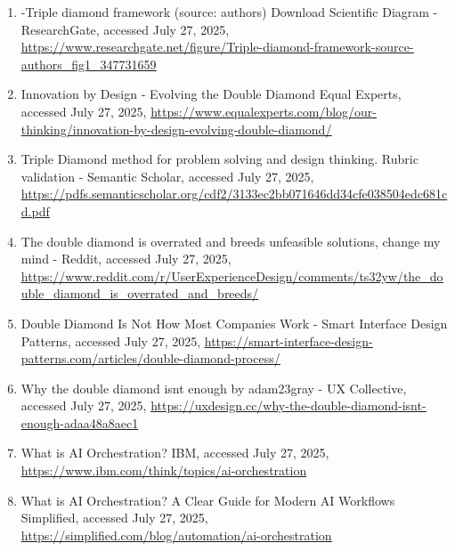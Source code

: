 \documentclass[
  12pt,
  a4paper,
  bibliography=totoc,
  numbers=noenddot
]{scrartcl}
\begin{document}
\begin{enumerate}
\item
  -Triple diamond framework (source: authors) \textbar{} Download
  Scientific Diagram - ResearchGate, accessed July 27, 2025,
  \href{https://www.researchgate.net/figure/Triple-diamond-framework-source-authors_fig1_347731659}{\ul{https://www.researchgate.net/figure/Triple-diamond-framework-source-authors\_fig1\_347731659}}
\item
  Innovation by Design - Evolving the Double Diamond \textbar{} Equal
  Experts, accessed July 27, 2025,
  \href{https://www.equalexperts.com/blog/our-thinking/innovation-by-design-evolving-double-diamond/}{\ul{https://www.equalexperts.com/blog/our-thinking/innovation-by-design-evolving-double-diamond/}}
\item
  Triple Diamond method for problem solving and design thinking. Rubric
  validation - Semantic Scholar, accessed July 27, 2025,
  \href{https://pdfs.semanticscholar.org/cdf2/3133ec2bb071646dd34cfe038504edc681cd.pdf}{\ul{https://pdfs.semanticscholar.org/cdf2/3133ec2bb071646dd34cfe038504edc681cd.pdf}}
\item
  The double diamond is overrated and breeds unfeasible solutions,
  change my mind - Reddit, accessed July 27, 2025,
  \href{https://www.reddit.com/r/UserExperienceDesign/comments/ts32yw/the_double_diamond_is_overrated_and_breeds/}{\ul{https://www.reddit.com/r/UserExperienceDesign/comments/ts32yw/the\_double\_diamond\_is\_overrated\_and\_breeds/}}
\item
  Double Diamond Is Not How Most Companies Work - Smart Interface Design
  Patterns, accessed July 27, 2025,
  \href{https://smart-interface-design-patterns.com/articles/double-diamond-process/}{\ul{https://smart-interface-design-patterns.com/articles/double-diamond-process/}}
\item
  Why the double diamond isn\textquotesingle t enough \textbar{} by
  adam23gray - UX Collective, accessed July 27, 2025,
  \href{https://uxdesign.cc/why-the-double-diamond-isnt-enough-adaa48a8aec1}{\ul{https://uxdesign.cc/why-the-double-diamond-isnt-enough-adaa48a8aec1}}
\item
  What is AI Orchestration? \textbar{} IBM, accessed July 27, 2025,
  \href{https://www.ibm.com/think/topics/ai-orchestration}{\ul{https://www.ibm.com/think/topics/ai-orchestration}}
\item
  What is AI Orchestration? A Clear Guide for Modern AI Workflows
  \textbar{} Simplified, accessed July 27, 2025,
  \href{https://simplified.com/blog/automation/ai-orchestration}{\ul{https://simplified.com/blog/automation/ai-orchestration}}

\end{enumerate}
\end{document}
